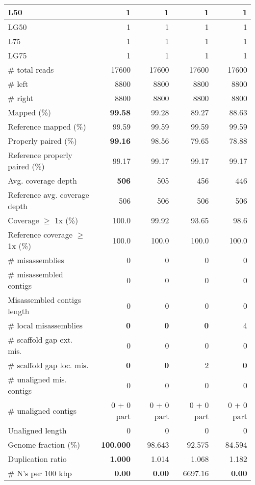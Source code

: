 \documentclass[12pt,a4paper]{article}
\begin{document}
\begin{table}[ht]
\begin{center}
\begin{tabular}{|l*{4}{|r}|}
L50 & 1 & 1 & 1 & 1 \\ \hline
LG50 & 1 & 1 & 1 & 1 \\ \hline
L75 & 1 & 1 & 1 & 1 \\ \hline
LG75 & 1 & 1 & 1 & 1 \\ \hline
\# total reads & 17600 & 17600 & 17600 & 17600 \\ \hline
\# left & 8800 & 8800 & 8800 & 8800 \\ \hline
\# right & 8800 & 8800 & 8800 & 8800 \\ \hline
Mapped (\%) & {\bf 99.58} & 99.28 & 89.27 & 88.63 \\ \hline
Reference mapped (\%) & 99.59 & 99.59 & 99.59 & 99.59 \\ \hline
Properly paired (\%) & {\bf 99.16} & 98.56 & 79.65 & 78.88 \\ \hline
Reference properly paired (\%) & 99.17 & 99.17 & 99.17 & 99.17 \\ \hline
Avg. coverage depth & {\bf 506} & 505 & 456 & 446 \\ \hline
Reference avg. coverage depth & 506 & 506 & 506 & 506 \\ \hline
Coverage $\geq$ 1x (\%) & 100.0 & 99.92 & 93.65 & 98.6 \\ \hline
Reference coverage $\geq$ 1x (\%) & 100.0 & 100.0 & 100.0 & 100.0 \\ \hline
\# misassemblies & 0 & 0 & 0 & 0 \\ \hline
\# misassembled contigs & 0 & 0 & 0 & 0 \\ \hline
Misassembled contigs length & 0 & 0 & 0 & 0 \\ \hline
\# local misassemblies & {\bf 0} & {\bf 0} & {\bf 0} & 4 \\ \hline
\# scaffold gap ext. mis. & 0 & 0 & 0 & 0 \\ \hline
\# scaffold gap loc. mis. & {\bf 0} & {\bf 0} & 2 & {\bf 0} \\ \hline
\# unaligned mis. contigs & 0 & 0 & 0 & 0 \\ \hline
\# unaligned contigs & 0 + 0 part & 0 + 0 part & 0 + 0 part & 0 + 0 part \\ \hline
Unaligned length & 0 & 0 & 0 & 0 \\ \hline
Genome fraction (\%) & {\bf 100.000} & 98.643 & 92.575 & 84.594 \\ \hline
Duplication ratio & {\bf 1.000} & 1.014 & 1.068 & 1.182 \\ \hline
\# N's per 100 kbp & {\bf 0.00} & {\bf 0.00} & 6697.16 & {\bf 0.00} \\ \hline

\end{tabular}
\end{center}
\end{table}
\end{document}
